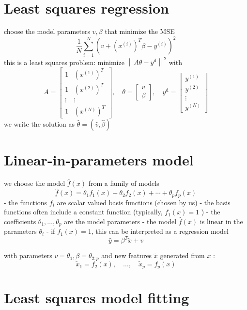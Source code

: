 \section{Least squares regression}

choose the model parameters $ v, \beta $ that minimize the MSE
$$
\frac{1}{N} \sum_{i=1}^{N}\left(v+\left(x^{(i)}\right)^{T} \beta-y^{(i)}\right)^{2}
$$
this is a least squares problem: minimize $ \left\|A \theta-y^{\mathrm{d}}\right\|^{2} $ with
$$
A=\left[\begin{array}{cc}
1 & \left(x^{(1)}\right)^{T} \\
1 & \left(x^{(2)}\right)^{T} \\
\vdots & \vdots \\
1 & \left(x^{(N)}\right)^{T}
\end{array}\right], \quad \theta=\left[\begin{array}{c}
v \\
\beta
\end{array}\right], \quad y^{\mathrm{d}}=\left[\begin{array}{c}
y^{(1)} \\
y^{(2)} \\
\vdots \\
y^{(N)}
\end{array}\right]
$$
we write the solution as $ \hat{\theta}=(\hat{v}, \hat{\beta}) $

\section{Linear-in-parameters model}

we choose the model $ \hat{f}(x) $ from a family of models
$$
\hat{f}(x)=\theta_{1} f_{1}(x)+\theta_{2} f_{2}(x)+\cdots+\theta_{p} f_{p}(x)
$$
- the functions $ f_{i} $ are scalar valued basis functions (chosen by us)
- the basis functions often include a constant function (typically, $ f_{1}(x)=1 $ )
- the coefficients $ \theta_{1}, \ldots, \theta_{p} $ are the model parameters
- the model $ \hat{f}(x) $ is linear in the parameters $ \theta_{i} $
- if $ f_{1}(x)=1 $, this can be interpreted as a regression model
$$
\hat{y}=\beta^{T} \tilde{x}+v
$$

with parameters $ v=\theta_{1}, \beta=\theta_{2: p} $ and new features $ \tilde{x} $ generated from $ x $ :
$$
\tilde{x}_{1}=f_{2}(x), \quad \ldots, \quad \tilde{x}_{p}=f_{p}(x)
$$

\section{Least squares model fitting}

